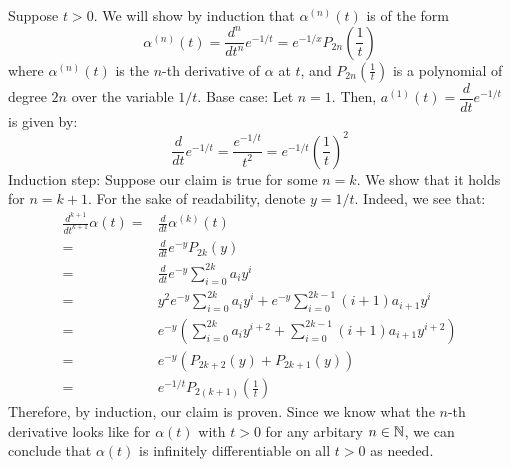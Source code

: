 \documentclass{article}
\begin{document}
\begin{soln}
    Suppose $ t > 0 $. We will show by induction that $ \alpha^{(n)}(t) $ is of the form
    \begin{equation*}
        \alpha^{(n)}(t) = \frac{d^{n}}{dt^{n}} e^{-1/t} = e^{-1/x} P_{2n}
        \left( \frac{1}{t} \right)
    \end{equation*}
    where $ \alpha^{(n)}(t) $ is the $ n $-th derivative of $ \alpha $ at $ t $,
    and $ P_{2n}(\frac{1}{t}) $ is a polynomial of degree $ 2n $ over the variable $ 1/t $. \vsp
    Base case: Let $ n = 1 $.
    Then, $ a^{(1)}(t) = \dfrac{d}{dt} e^{-1/t} $ is given by:
    \begin{equation*}
        \frac{d}{dt} e^{-1/t} = \frac{e^{-1/t}}{t^{2}} = e^{-1/t} \left( \frac{1}{t} \right)^{2}
    \end{equation*}
    Induction step: Suppose our claim is true for some $ n = k $.
    We show that it holds for $ n = k +1 $.
    For the sake of readability, denote $ y = 1/t $. Indeed, we see that:
    \begin{align*}
        \frac{d^{k+1}}{dt^{k+1}} \alpha(t) = & \frac{d}{dt} \alpha^{(k)}(t) \\
                    = & \frac{d}{dt} e^{-y}P_{2k}(y) \\
                    = & \frac{d}{dt} e^{-y}\sum_{i = 0}^{2k} {a_{i}y^{i}} \\
                    = & y^{2} e^{-y} \sum_{i=0}^{2k} {a_{i}y^{i}}
                    + e^{-y} \sum_{i = 0}^{2k-1} {(i+1)a_{i+1}y^{i}} \\
                    = & e^{-y} \left( \sum_{i=0}^{2k} {a_{i}y^{i+2}}
                    + \sum_{i=0}^{2k-1} {(i+1)a_{i+1}y^{i+2}} \right) \\
                    = & e^{-y} \left( P_{2k+2}(y) + P_{2k+1}(y) \right) \\
                    = & e^{-1/t} P_{2(k+1)} \left( \frac{1}{t} \right)
    \end{align*}
    Therefore, by induction, our claim is proven.
    Since we know what the $ n $-th derivative looks like for $ \alpha(t) $ with $ t > 0 $
    for any arbitary $ n \in \mathbb{N} $, we can conclude that $ \alpha(t) $ is infinitely
    differentiable on all $ t > 0 $ as needed. \npgh
    

\end{soln}
\end{document}
